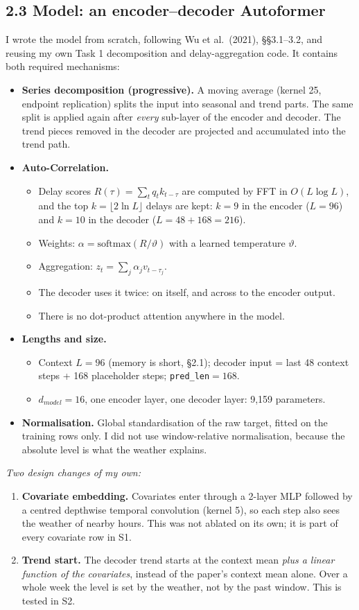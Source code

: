 \subsection*{2.3 Model: an encoder--decoder Autoformer}
I wrote the model from scratch, following Wu et al.\ (2021), \S\S3.1--3.2, and reusing my own Task 1 decomposition and delay-aggregation code. It contains both required mechanisms:
\begin{itemize}
\item \textbf{Series decomposition (progressive).} A moving average (kernel 25, endpoint replication) splits the input into seasonal and trend parts. The same split is applied again after \emph{every} sub-layer of the encoder and decoder. The trend pieces removed in the decoder are projected and accumulated into the trend path.
\item \textbf{Auto-Correlation.}
  \begin{itemize}
  \item Delay scores $R(\tau)=\sum_t q_t k_{t-\tau}$ are computed by FFT in $O(L\log L)$, and the top $k=\lfloor 2\ln L\rfloor$ delays are kept: $k=9$ in the encoder ($L=96$) and $k=10$ in the decoder ($L=48+168=216$).
  \item Weights: $\alpha=\mathrm{softmax}(R/\vartheta)$ with a learned temperature $\vartheta$.
  \item Aggregation: $z_t=\sum_j \alpha_j v_{t-\tau_j}$.
  \item The decoder uses it twice: on itself, and across to the encoder output.
  \item There is no dot-product attention anywhere in the model.
  \end{itemize}
\item \textbf{Lengths and size.}
  \begin{itemize}
  \item Context $L=96$ (memory is short, \S2.1); decoder input = last 48 context steps + 168 placeholder steps; \texttt{pred\_len}$=168$.
  \item $d_{model}=16$, one encoder layer, one decoder layer: 9,159 parameters.
  \end{itemize}
\item \textbf{Normalisation.} Global standardisation of the raw target, fitted on the training rows only. I did not use window-relative normalisation, because the absolute level is what the weather explains.
\end{itemize}
\emph{Two design changes of my own:}
\begin{enumerate}
\item \textbf{Covariate embedding.} Covariates enter through a 2-layer MLP followed by a centred depthwise temporal convolution (kernel 5), so each step also sees the weather of nearby hours. This was not ablated on its own; it is part of every covariate row in S1.
\item \textbf{Trend start.} The decoder trend starts at the context mean \emph{plus a linear function of the covariates}, instead of the paper's context mean alone. Over a whole week the level is set by the weather, not by the past window. This is tested in S2.
\end{enumerate}

